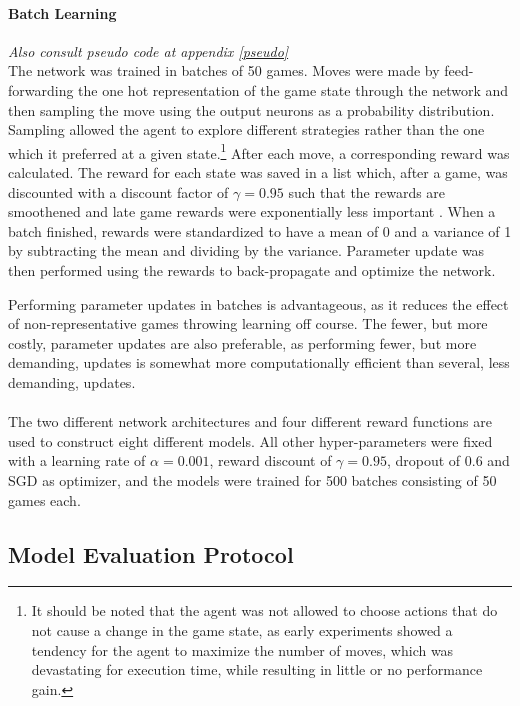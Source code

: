\documentclass[11pt, fleqn]{article}
\begin{document}
\paragraph*{Batch Learning} \textit{Also consult pseudo code at appendix \ref{pseudo}}\\
The network was trained in batches of 50 games. Moves were made by feed-forwarding the one hot representation of the game state through the network and then sampling the move using the output neurons as a probability distribution. Sampling allowed the agent to explore different strategies rather than the one which it preferred at a given state.\footnote{It should be noted that the agent was not allowed to choose actions that do not cause a change in the game state, as early experiments showed a tendency for the agent to maximize the number of moves, which was devastating for execution time, while resulting in little or no performance gain.} After each move, a corresponding reward was calculated. The reward for each state was saved in a list which, after a game, was discounted with a discount factor of $\gamma = 0.95$ such that the rewards are smoothened and late game rewards were exponentially less important \cite{Kar}. When a batch finished, rewards were standardized to have a mean of 0 and a variance of 1 by subtracting the mean and dividing by the variance. Parameter update was then performed using the rewards to back-propagate and optimize the network. 

Performing parameter updates in batches is advantageous, as it reduces the effect of non-representative games throwing learning off course. The fewer, but more costly, parameter updates are also preferable, as performing fewer, but more demanding, updates is somewhat more computationally efficient than several, less demanding, updates.
\\
\\
The two different network architectures and four different reward functions are used to construct eight different models. All other hyper-parameters were fixed with a learning rate of $\alpha = 0.001$, reward discount of $\gamma = 0.95$, dropout of 0.6 and SGD as optimizer, and the models were trained for 500 batches consisting of 50 games each.
\subsection*{Model Evaluation Protocol}
\end{document}

